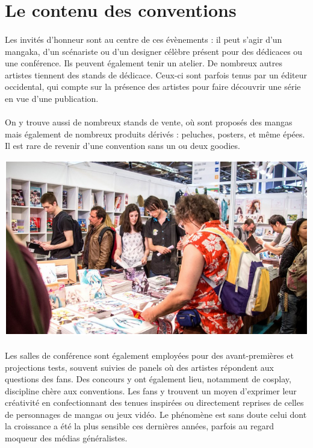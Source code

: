 \section{Le contenu des conventions}

\paragraph{} Les invités d’honneur sont au centre de ces évènements : il peut
s’agir d’un mangaka, d’un scénariste ou d’un designer célèbre présent pour des
dédicaces ou une conférence. Ils peuvent également tenir un atelier. De
nombreux autres artistes tiennent des stands de dédicace. Ceux-ci sont parfois
tenus par un éditeur occidental, qui compte sur la présence des artistes pour
faire découvrir une série en vue d’une publication.

\paragraph{} On y trouve aussi de nombreux stands de vente, où sont proposés
des mangas mais également de nombreux produits dérivés : peluches, posters, et
même épées. Il est rare de revenir d’une convention sans un ou deux goodies.

\begin{center}
	\includegraphics[scale=0.5]{boutique.png}
\end{center}

\paragraph{} Les salles de conférence sont également employées pour des
avant-premières et projections tests, souvent suivies de panels où des artistes
répondent aux questions des fans. Des concours y ont également lieu, notamment
de cosplay, discipline chère aux conventions. Les fans y trouvent un moyen
d’exprimer leur créativité en confectionnant des tenues inspirées ou
directement reprises de celles de personnages de mangas ou jeux vidéo. Le
phénomène est sans doute celui dont la croissance a été la plus sensible ces
dernières années, parfois au regard moqueur des médias généralistes.

